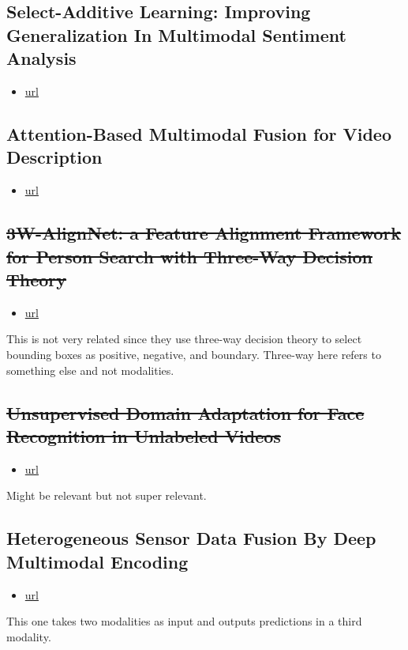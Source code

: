 \documentclass[11pt]{article}
\begin{document}
\subsection{Select-Additive Learning: Improving Generalization In Multimodal Sentiment Analysis}

\begin{itemize}
\item \href{https://ieeexplore.ieee.org/stamp/stamp.jsp?tp=\&arnumber=8019301}{url}
\end{itemize}

\subsection{Attention-Based Multimodal Fusion for Video Description}

\begin{itemize}
\item \href{https://openaccess.thecvf.com/content\_ICCV\_2017/papers/Hori\_Attention-Based\_Multimodal\_Fusion\_ICCV\_2017\_paper.pdf}{url}
\end{itemize}
\subsection{\st{3W-AlignNet: a Feature Alignment Framework for Person Search with Three-Way Decision Theory}}

\begin{itemize}
\item \href{https://link.springer.com/article/10.1007/s12559-021-09898-7}{url}
\end{itemize}

This is not very related since they use three-way decision theory to select bounding boxes as positive, negative, and boundary.
Three-way here refers to something else and not modalities.

\subsection{\st{Unsupervised Domain Adaptation for Face Recognition in Unlabeled Videos}}
\begin{itemize}
\item \href{https://openaccess.thecvf.com/content\_ICCV\_2017/papers/Sohn\_Unsupervised\_Domain\_Adaptation\_ICCV\_2017\_paper.pdf}{url}
\end{itemize}
Might be relevant but not super relevant.


\subsection{Heterogeneous Sensor Data Fusion By Deep Multimodal Encoding}
\begin{itemize}
\item \href{https://ieeexplore.ieee.org/stamp/stamp.jsp?tp=&arnumber=7874158}{url}
\end{itemize}
This one takes two modalities as input and outputs predictions in a third modality.
\end{document}
